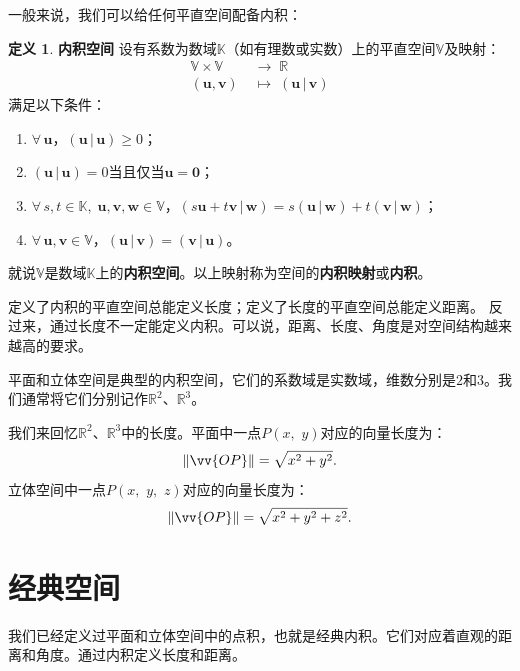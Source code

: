 \documentclass[12pt,UTF8]{ctexbook}
\newcommand{\nji}[2]{\displaystyle\left( #1 \,|\, #2\right)}
\theoremstyle{definition}
\newtheorem{df}{定义}[section]
\theoremstyle{plain}
\begin{document}
一般来说，我们可以给任何平直空间配备内积：
\begin{df}{\textbf{内积空间}}
    设有系数为数域$\mathbb{K}$（如有理数或实数）上的平直空间$\mathbb{V}$及映射：
    \begin{align*}
        \mathbb{V}\times \mathbb{V} \;&\rightarrow \;\mathbb{R} \\
        (\mathbf{u}, \mathbf{v}) \;&\mapsto \; \nji{\mathbf{u}}{\mathbf{v}}
    \end{align*}
    满足以下条件：
    \begin{enumerate}
        \item $\forall \, \mathbf{u}$，$\nji{\mathbf{u}}{\mathbf{u}} \geqslant 0$；
        \item $\nji{\mathbf{u}}{\mathbf{u}} = 0$当且仅当$\mathbf{u} = \mathbf{0}$；
        \item $\forall \, s, t \in \mathbb{K}, \; \mathbf{u}, \mathbf{v}, \mathbf{w}\in \mathbb{V}$，$\nji{s\mathbf{u} + t\mathbf{v}}{\mathbf{w}} = s\nji{\mathbf{u}}{\mathbf{w}} + t\nji{\mathbf{v}}{\mathbf{w}}$；
        \item $\forall \, \mathbf{u}, \mathbf{v} \in \mathbb{V}$，$\nji{\mathbf{u}}{\mathbf{v}} = \nji{\mathbf{v}}{\mathbf{u}}$。
    \end{enumerate}
    就说$\mathbb{V}$是数域$\mathbb{K}$上的\textbf{内积空间}。以上映射称为空间的\textbf{内积映射}或\textbf{内积}。
\end{df}

定义了内积的平直空间总能定义长度；定义了长度的平直空间总能定义距离。
反过来，通过长度不一定能定义内积。可以说，距离、长度、角度是对空间结构越来越高的要求。

平面和立体空间是典型的内积空间，它们的系数域是实数域，维数分别是$2$和$3$。我们通常将它们分别记作$\mathbb{R}^2$、$\mathbb{R}^3$。

我们来回忆$\mathbb{R}^2$、$\mathbb{R}^3$中的长度。平面中一点$P(x, \,\,y)$对应的向量长度为：
$$ \| \vv{OP} \| = \sqrt{x^2 + y^2}.$$
立体空间中一点$P(x, \,\,y, \,\,z)$对应的向量长度为：
$$ \| \vv{OP} \| = \sqrt{x^2 + y^2 + z^2}.$$

\section{经典空间}

我们已经定义过平面和立体空间中的点积，也就是经典内积。它们对应着直观的距离和角度。通过内积定义长度和距离。
\end{document}
